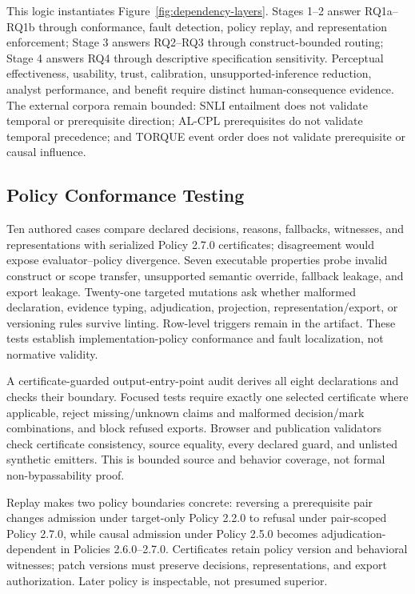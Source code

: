 \documentclass[manuscript,screen,review,anonymous]{acmart}
\begin{document}
This logic instantiates Figure~\ref{fig:dependency-layers}. Stages 1--2 answer RQ1a--RQ1b through conformance, fault detection, policy replay, and representation enforcement; Stage 3 answers RQ2--RQ3 through construct-bounded routing; Stage 4 answers RQ4 through descriptive specification sensitivity. Perceptual effectiveness, usability, trust, calibration, unsupported-inference reduction, analyst performance, and benefit require distinct human-consequence evidence. The external corpora remain bounded: SNLI entailment does not validate temporal or prerequisite direction; AL-CPL prerequisites do not validate temporal precedence; and TORQUE event order does not validate prerequisite or causal influence.

\subsection{Policy Conformance Testing}

Ten authored cases compare declared decisions, reasons, fallbacks, witnesses, and representations with serialized Policy 2.7.0 certificates; disagreement would expose evaluator--policy divergence. Seven executable properties probe invalid construct or scope transfer, unsupported semantic override, fallback leakage, and export leakage. Twenty-one targeted mutations ask whether malformed declaration, evidence typing, adjudication, projection, representation/export, or versioning rules survive linting. Row-level triggers remain in the artifact. These tests establish implementation-policy conformance and fault localization, not normative validity.

A certificate-guarded output-entry-point audit derives all eight declarations and checks their boundary. Focused tests require exactly one selected certificate where applicable, reject missing/unknown claims and malformed decision/mark combinations, and block refused exports. Browser and publication validators check certificate consistency, source equality, every declared guard, and unlisted synthetic emitters. This is bounded source and behavior coverage, not formal non-bypassability proof.

Replay makes two policy boundaries concrete: reversing a prerequisite pair changes admission under target-only Policy 2.2.0 to refusal under pair-scoped Policy 2.7.0, while causal admission under Policy 2.5.0 becomes adjudication-dependent in Policies 2.6.0--2.7.0. Certificates retain policy version and behavioral witnesses; patch versions must preserve decisions, representations, and export authorization. Later policy is inspectable, not presumed superior.
\end{document}
